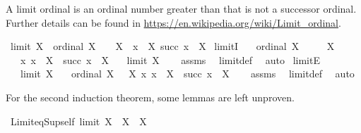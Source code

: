 \begin{isabellebody}
\begin{isamarkuptext}
A limit ordinal  is an ordinal number greater than  that is not a successor ordinal.
Further details can be found in \url{https://en.wikipedia.org/wiki/Limit_ordinal}.%
\end{isamarkuptext}\isamarkuptrue%
\isamarkupfalse%
\ {\isachardoublequoteopen}limit\ X\ {\isasymequiv}\ ordinal\ X\ {\isasymand}\ {}\ {\isasymin}\ X\ {\isasymand}\ {\isacharparenleft}{\kern0pt}{\isasymforall}x\ {\isasymin}\ X{\isachardot}{\kern0pt}\ succ\ x\ {\isasymin}\ X{\isacharparenright}{\kern0pt}{\isachardoublequoteclose}\isanewline
\isanewline
{}\isamarkupfalse%
\ limitI{\isacharcolon}{\kern0pt}\isanewline
\ \ \ {\isachardoublequoteopen}ordinal\ X{\isachardoublequoteclose}\isanewline
\ \ \ {\isachardoublequoteopen}{}\ {\isasymin}\ X{\isachardoublequoteclose}\isanewline
\ \ \ {\isachardoublequoteopen}{\isasymAnd}x{\isachardot}{\kern0pt}\ x\ {\isasymin}\ X\ {\isasymLongrightarrow}\ succ\ x\ {\isasymin}\ X{\isachardoublequoteclose}\isanewline
\ \ \ {\isachardoublequoteopen}limit\ X{\isachardoublequoteclose}\isanewline
%
\isadelimproof
\ \ %
\endisadelimproof
%
\isatagproof
{}\isamarkupfalse%
\ assms\ \isamarkupfalse%
\ limit{\isacharunderscore}{\kern0pt}def\ \isamarkupfalse%
\ auto%
\endisatagproof
{\isafoldproof}%
%
\isadelimproof
\isanewline
%
\endisadelimproof
\isanewline
{}\isamarkupfalse%
\ limitE{\isacharcolon}{\kern0pt}\isanewline
\ \ \ {\isachardoublequoteopen}limit\ X{\isachardoublequoteclose}\isanewline
\ \ \ {\isachardoublequoteopen}ordinal\ X{\isachardoublequoteclose}\ {\isachardoublequoteopen}{}\ {\isasymin}\ X{\isachardoublequoteclose}\ {\isachardoublequoteopen}{\isasymAnd}x{\isachardot}{\kern0pt}\ x\ {\isasymin}\ X\ {\isasymLongrightarrow}\ succ\ x\ {\isasymin}\ X{\isachardoublequoteclose}\isanewline
%
\isadelimproof
\ \ %
\endisadelimproof
%
\isatagproof
{}\isamarkupfalse%
\ assms\ \isamarkupfalse%
\ limit{\isacharunderscore}{\kern0pt}def\ \isamarkupfalse%
\ auto%
\endisatagproof
{\isafoldproof}%
%
\isadelimproof
%
\endisadelimproof
%
\begin{isamarkuptext}%
For the second induction theorem, some lemmas are left unproven.%
\end{isamarkuptext}\isamarkuptrue%
\isamarkupfalse%
\ Limit{\isacharunderscore}{\kern0pt}eq{\isacharunderscore}{\kern0pt}Sup{\isacharunderscore}{\kern0pt}self{\isacharcolon}{\kern0pt}\ {\isachardoublequoteopen}limit\ X\ {\isasymLongrightarrow}\ {\isasymUnion}X\ {\isacharequal}{\kern0pt}\ X{\isachardoublequoteclose}\isanewline

\end{isabellebody}
